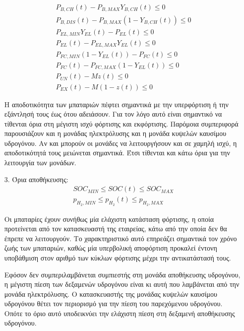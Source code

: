 \begin{itemize}
\begin{align}
    P_{B,CH}(t) - P_{B,MAX}Y_{B,CH}(t) \leq 0 \\
    P_{B,DIS}(t) - P_{B,MAX}(1-Y_{B,CH}(t))\leq 0 \\
    P_{EL,MIN}Y_{EL}(t) - P_{EL}(t) \leq 0 \\
    P_{EL}(t) - P_{EL,MAX}Y_{EL}(t) \leq 0\\
    P_{FC,MIN}(1 - Y_{EL}(t)) - P_{FC}(t)\leq  0\\
    P_{FC}(t) - P_{FC,MAX}(1-Y_{EL}(t))\leq 0 \\
    P_{UN}(t) - M z(t) \leq 0 \\
    P_{EX}(t) - M (1-z(t))  \leq 0  
\end{align}

Η αποδοτικότητα των μπαταριών πέφτει σημαντικά με την υπερφόρτιση ή την εξάντλησή τους έως ότου αδειάσουν. Για τον λόγο αυτό είναι σημαντικό να τίθενται όρια στη μέγιστη ισχύ φόρτισης και εκφόρτισης. Παρόμοια συμπεριφορά παρουσιάζουν και η μονάδας ηλεκτρόλυσης και η μονάδα κυψελών καυσίμου υδρογόνου. Αν και μπορούν οι μονάδες να λειτουργήσουν και σε χαμηλή ισχύ, η αποδοτικότητά τους μειώνεται σημαντικά. Έτσι τίθενται και κάτω όρια για την λειτουργία των μονάδων.

\item[3.] Όρια αποθήκευσης: 
\begin{align}
    SOC_{MIN} \leq SOC(t) \leq SOC_{MAX} \\
    p_{H_2,MIN} \leq p_{H_2}(t) \leq p_{H_2,MAX} 
\end{align}

Οι μπαταρίες έχουν συνήθως μία ελάχιστη κατάσταση φόρτισης, η οποία προτείνεται από τον κατασκευαστή της εταιρείας, κάτω από την οποία δεν θα έπρεπε να λειτουργούν. Το χαρακτηριστικό αυτό επηρεάζει σημαντικά τον χρόνο ζωής των μπαταριών, καθώς μία υπερβολική αποφόρτιση προκαλεί έντονη υποβάθμιση  στον αριθμό των κύκλων φόρτισης μέχρι την αντικατάστασή τους.

Εφόσον δεν συμπεριλαμβάνεται συμπιεστής στη μονάδα αποθήκευσης υδρογόνου, η μέγιστη πίεση των δεξαμενών υδρογόνου είναι κι αυτή που λαμβάνεται από την μονάδα ηλεκτρόλυσης. Ο κατασκευαστής της μονάδας κυψελών καυσίμου υδρογόνου θέτει τον περιορισμό για την πίεση του παρεχόμενου υδρογόνου. Οπότε το όριο αυτό υποδεικνύει την ελάχιστη πίεση στη δεξαμενή αποθήκευσης υδρογόνου. 
\end{itemize} 



